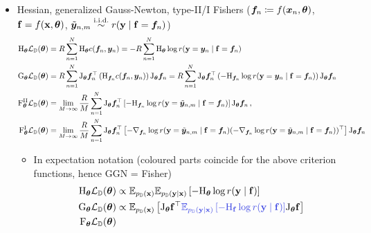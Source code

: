 \begin{itemize}
\item Hessian, generalized Gauss-Newton, type-II/I Fishers (${\bm{f}}_n \coloneq f({\bm{x}}_n, {\bm{\theta}})$, ${\mathbf{f}} = f({\mathbf{x}}, {\bm{\theta}})$, $\tilde{\vy}_{n,m} \stackrel{\text{\iid}}{\sim} r(\rvy \mid \rvf = \vf_n)$)
  \begin{align*}
    \mathrm{H}_{{\bm{\theta}}} {\mathcal{L}}_{{\mathbb{D}}}({\bm{\theta}})
    &= R \sum_{n=1}^N \mathrm{H}_{{\bm{\theta}}} c({\bm{f}}_n, {\bm{y}}_n)
      = -R \sum_{n=1}^N \mathrm{H}_{{\bm{\theta}}} \log r({\mathbf{y}} = {\bm{y}}_n \mid {\mathbf{f}} = {\bm{f}}_n)
    \\
    \mathrm{G}_{{\bm{\theta}}}{\mathcal{L}}_{{\mathbb{D}}}({\bm{\theta}})
    &= R \sum_{n=1}^N
      \mathrm{J}_{{\bm{\theta}}} {\bm{f}}_n^{\top}
      \left(
      \mathrm{H}_{{\bm{f}}_n} c({\bm{f}}_n, {\bm{y}}_n)
      \right)
      \mathrm{J}_{{\bm{\theta}}} {\bm{f}}_n
      =
      R \sum_{n=1}^N
      \mathrm{J}_{{\bm{\theta}}} {\bm{f}}_n^{\top}
      \left(
      -\mathrm{H}_{{\bm{f}}_n} \log r({\mathbf{y}} = {\bm{y}}_n \mid {\mathbf{f}} = {\bm{f}}_n)
      \right)
      \mathrm{J}_{{\bm{\theta}}} {\bm{f}}_n
    \\
    \mathrm{F}^{\text{II}}_{{\bm{\theta}}} {\mathcal{L}}_{{\mathbb{D}}}({\bm{\theta}})
    &=
      \lim_{M \to \infty}
      \frac{R}{M}
      \sum_{n=1}^N
      \mathrm{J}_{{\bm{\theta}}} {\bm{f}}_n^{\top}
      \left[
      -\mathrm{H}_{{\bm{f}}_n} \log r({\mathbf{y}} = \tilde{{\bm{y}}}_{n,m} \mid {\mathbf{f}} = {\bm{f}}_n)
      \right]
      \mathrm{J}_{{\bm{\theta}}} {\bm{f}}_n\,,
    \\
    \mathrm{F}^{\text{I}}_{{\bm{\theta}}} {\mathcal{L}}_{{\mathbb{D}}}({\bm{\theta}})
    &=
      \lim_{M \to \infty}
      \frac{R}{M}
      \sum_{n=1}^N
      \mathrm{J}_{{\bm{\theta}}} {\bm{f}}_n^{\top}
      \left[
      -\nabla_{{\bm{f}}_n} \log r({\mathbf{y}} = \tilde{{\bm{y}}}_{n,m} \mid {\mathbf{f}} = {\bm{f}}_n)
      (-\nabla_{{\bm{f}}_n} \log r({\mathbf{y}} = \tilde{{\bm{y}}}_{n,m} \mid {\mathbf{f}} = {\bm{f}}_n))^{\top}
      \right]
      \mathrm{J}_{{\bm{\theta}}} {\bm{f}}_n
  \end{align*}
  \begin{itemize}
  \item In expectation notation (coloured parts coincide for the above criterion functions, hence GGN = Fisher)
    \begin{align*}
      \hess_{\vtheta} \gL_{\sD}(\vtheta)
      &\propto
        \E_{p_{\sD}(\rvx)}
        \E_{p_{\sD}(\rvy \mid \rvx)}
        \left[
        -\hess_{\vtheta} \log r(\rvy \mid \rvf)
        \right]
      \\
      \ggn_{\vtheta}\gL_{\sD}(\vtheta)
      &\propto
        \E_{p_{\sD}(\rvx)}
        \left[
        \jac_{\vtheta} \rvf^{\top}
        \textcolor{VectorBlue}{
        \E_{p_{\sD}(\rvy \mid \rvx)}
        \left[
        -\hess_{\rvf} \log r(\rvy \mid \rvf)
        \right]
        }
        \jac_{\vtheta} \rvf
        \right]
      \\
      \fisher_{\vtheta} \gL_{\sD}(\vtheta)

\end{align*}
\end{itemize}
\end{itemize}
